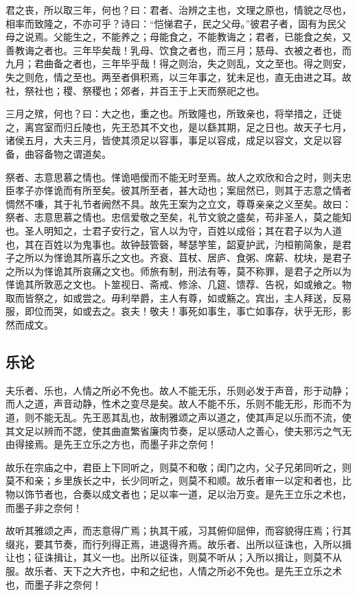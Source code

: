 \documentclass[]{article}
\begin{document}
君之丧，所以取三年，何也？曰：君者、治辨之主也，文理之原也，情貌之尽也，相率而致隆之，不亦可乎？诗曰：``恺悌君子，民之父母。''彼君子者，固有为民父母之说焉。父能生之，不能养之；母能食之，不能教诲之；君者，已能食之矣，又善教诲之者也。三年毕矣哉！乳母、饮食之者也，而三月；慈母、衣被之者也，而九月；君曲备之者也，三年毕乎哉！得之则治，失之则乱，文之至也。得之则安，失之则危，情之至也。两至者俱积焉，以三年事之，犹未足也，直无由进之耳。故社，祭社也；稷、祭稷也；郊者，并百王于上天而祭祀之也。

三月之殡，何也？曰：大之也，重之也。所致隆也，所致亲也，将举措之，迁徙之，离宫室而归丘陵也，先王恐其不文也，是以繇其期，足之日也。故天子七月，诸侯五月，大夫三月，皆使其须足以容事，事足以容成，成足以容文，文足以容备，曲容备物之谓道矣。

祭者、志意思慕之情也。愅诡唈僾而不能无时至焉。故人之欢欣和合之时，则夫忠臣孝子亦愅诡而有所至矣。彼其所至者，甚大动也；案屈然已，则其于志意之情者惆然不嗛，其于礼节者阙然不具。故先王案为之立文，尊尊亲亲之义至矣。故曰：祭者、志意思慕之情也。忠信爱敬之至矣，礼节文貌之盛矣，苟非圣人，莫之能知也。圣人明知之，士君子安行之，官人以为守，百姓以成俗；其在君子以为人道也，其在百姓以为鬼事也。故钟鼓管磬，琴瑟竽笙，韶夏护武，汋桓箾简象，是君子之所以为愅诡其所喜乐之文也。齐衰、苴杖、居庐、食粥、席薪、枕块，是君子之所以为愅诡其所哀痛之文也。师旅有制，刑法有等，莫不称罪，是君子之所以为愅诡其所敦恶之文也。卜筮视日、斋戒、修涂、几筵、馈荐、告祝，如或飨之。物取而皆祭之，如或尝之。毋利举爵，主人有尊，如或觞之。宾出，主人拜送，反易服，即位而哭，如或去之。哀夫！敬夫！事死如事生，事亡如事存，状乎无形，影然而成文。

\hypertarget{header-n88}{%
\subsection{乐论}\label{header-n88}}

夫乐者、乐也，人情之所必不免也。故人不能无乐，乐则必发于声音，形于动静；而人之道，声音动静，性术之变尽是矣。故人不能不乐，乐则不能无形，形而不为道，则不能无乱。先王恶其乱也，故制雅颂之声以道之，使其声足以乐而不流，使其文足以辨而不諰，使其曲直繁省廉肉节奏，足以感动人之善心，使夫邪污之气无由得接焉。是先王立乐之方也，而墨子非之奈何！

故乐在宗庙之中，君臣上下同听之，则莫不和敬；闺门之内，父子兄弟同听之，则莫不和亲；乡里族长之中，长少同听之，则莫不和顺。故乐者审一以定和者也，比物以饰节者也，合奏以成文者也；足以率一道，足以治万变。是先王立乐之术也，而墨子非之奈何！

故听其雅颂之声，而志意得广焉；执其干戚，习其俯仰屈伸，而容貌得庄焉；行其缀兆，要其节奏，而行列得正焉，进退得齐焉。故乐者、出所以征诛也，入所以揖让也；征诛揖让，其义一也。出所以征诛，则莫不听从；入所以揖让，则莫不从服。故乐者、天下之大齐也，中和之纪也，人情之所必不免也。是先王立乐之术也，而墨子非之奈何！
\end{document}
